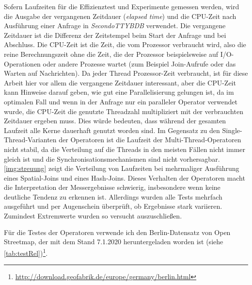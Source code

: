 \documentclass[a4paper,12pt,twoside]{article}
\newcommand{\Fb}[1]{\textit{#1}} %
\begin{document}
Sofern Laufzeiten für die Effizienztest und Experimente gemessen werden, wird die Ausgabe der vergangenen Zeitdauer (\Fb{elapsed time}) und die CPU-Zeit nach Ausführung einer Anfrage in \Fb{SecondoTTYBDB} verwendet. Die vergangene Zeitdauer ist die Differenz der Zeitstempel beim Start der Anfrage und bei Abschluss. Die CPU-Zeit ist die Zeit, die vom Prozessor verbraucht wird, also die reine Berechnungszeit ohne die Zeit, die der Prozessor beispielsweise auf I/O-Operationen oder andere Prozesse wartet (zum Beispiel Join-Aufrufe oder das Warten auf Nachrichten). Da jeder Thread Prozessor-Zeit verbraucht, ist für diese Arbeit hier vor allem die vergangene Zeitdauer interessant, aber die CPU-Zeit kann Hinweise darauf geben, wie gut eine Parallelisierung gelungen ist, da im optimalen Fall und wenn in der Anfrage nur ein paralleler Operator verwendet wurde, die CPU-Zeit die genutzte Threadzahl multipliziert mit der verbrauchten Zeitdauer ergeben muss. Dies würde bedeuten, dass während der gesamten Laufzeit alle Kerne dauerhaft genutzt worden sind. Im Gegensatz zu den Single-Thread-Varianten der Operatoren ist die Laufzeit der Multi-Thread-Operatoren nicht stabil, da die Verteilung auf die Threads in den meisten Fällen nicht immer gleich ist und die Synchronisationsmechanismen sind nicht vorhersagbar. \autoref{img:streuung} zeigt die Verteilung von Laufzeiten bei mehrmaliger Ausführung eines Spatial-Joins und eines Hash-Joins. Dieses Verhalten der Operatoren macht die Interpretation der Messergebnisse schwierig, insbesondere wenn keine deutliche Tendenz zu erkennen ist. Allerdings wurden alle Tests mehrfach ausgeführt und per Augenschein überprüft, ob Ergebnisse stark variieren. Zumindest Extremwerte wurden so versucht auszuschließen.  

Für die Testes der Operatoren verwende ich den Berlin-Datensatz von Open Streetmap, der mit dem Stand 7.1.2020 heruntergeladen worden ist (siehe \autoref{tab:testRel})\footnote{\url{http://download.geofabrik.de/europe/germany/berlin.html}}.
\end{document}
